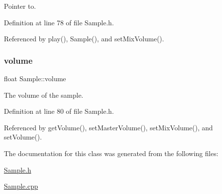 Pointer to. 



Definition at line 78 of file Sample.\+h.



Referenced by play(), Sample(), and set\+Mix\+Volume().

\mbox{\label{class_sample_a74a4b4799b2bdec9fdde363992b9cec8}} 
\subsubsection{\texorpdfstring{volume}{volume}}
{\footnotesize\ttfamily float Sample\+::volume\hspace{0.3cm}{\ttfamily [private]}}



The volume of the sample. 



Definition at line 80 of file Sample.\+h.



Referenced by get\+Volume(), set\+Master\+Volume(), set\+Mix\+Volume(), and set\+Volume().



The documentation for this class was generated from the following files\+:\begin{DoxyCompactItemize}
\item 
\hyperlink{_sample_8h}{Sample.\+h}\item 
\hyperlink{_sample_8cpp}{Sample.\+cpp}\end{DoxyCompactItemize}
